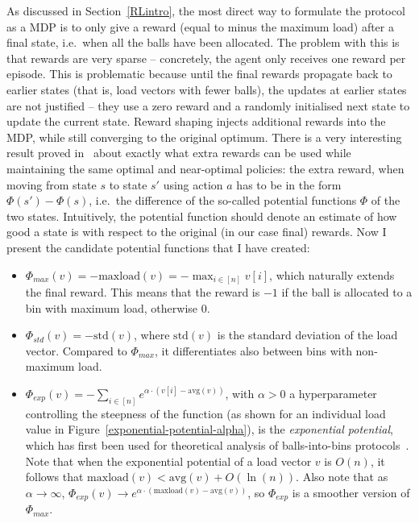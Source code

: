 As discussed in Section~\ref{RLintro}, the most direct way to formulate the \TwoThinning protocol as a MDP is to only give a reward (equal to minus the maximum load) after a final state, i.e.\ when all the balls have been allocated. The problem with this is that rewards are very sparse -- concretely, the agent only receives one reward per episode. This is problematic because until the final rewards propagate back to earlier states (that is, load vectors with fewer balls), the updates at earlier states are not justified -- they use a zero reward and a randomly initialised next state to update the current state. Reward shaping injects additional rewards into the MDP, while still converging to the original optimum. There is a very interesting result proved in~\cite{ng1999rewardshaping} about exactly what extra rewards can be used while maintaining the same optimal and near-optimal policies: the extra reward, when moving from state $s$ to state $s'$ using action $a$ has to be in the form $\Phi(s')-\Phi(s)$, i.e.\ the difference of the so-called potential functions $\Phi$ of the two states. Intuitively, the potential function should denote an estimate of how good a state is with respect to the original (in our case final) rewards. Now I present the candidate potential functions that I have created:

\begin{itemize}
    \item
    $\Phi_{max}(v)=-\mathrm{maxload}(v)=- \max_{i \in [n]} v[i]$, which naturally extends the final reward. This means that the reward is $-1$ if the ball is allocated to a bin with maximum load, otherwise $0$.
    \item
    $\Phi_{std}(v)=-\mathrm{std}(v)$, where $\mathrm{std}(v)$ is the standard deviation of the load vector. Compared to $\Phi_{max}$, it differentiates also between bins with non-maximum load.
    \item
    $\Phi_{exp}(v)=-\sum_{i \in [n]} e^{\alpha \cdot  (v[i] - \mathrm{avg}(v))}$, with $\alpha>0$ a hyperparameter controlling the steepness of the function (as shown for an individual load value in Figure~\ref{exponential-potential-alpha}), is the \textit{exponential potential}, which has first been used for theoretical analysis of balls-into-bins protocols~\cite{ghosh1999exponentialpotential}. Note that when the exponential potential of a load vector $v$ is $O(n)$, it follows that $\mathrm{maxload}(v) < \mathrm{avg}(v)+O(\ln(n))$. Also note that as $\alpha \to \infty$, $\Phi_{exp}(v) \to e^{\alpha \cdot  (\mathrm{maxload}(v) - \mathrm{avg}(v))}$, so $\Phi_{exp}$ is a smoother version of $\Phi_{max}$.
\end{itemize}


